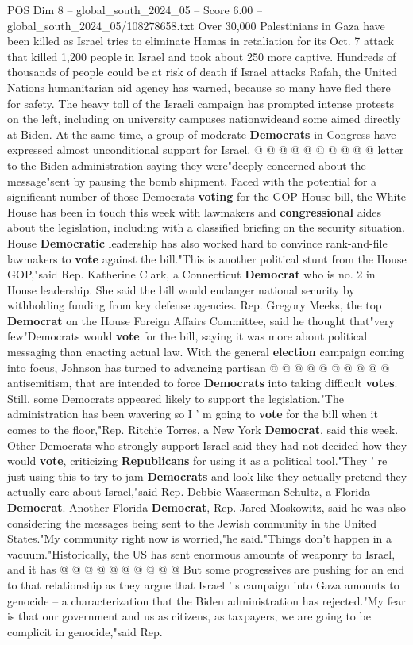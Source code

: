 \begin{textsample}{POS Dim 8 – global\_south\_2024\_05 – Score 6.00 – global\_south\_2024\_05/108278658.txt}
Over 30,000 Palestinians in Gaza have been killed as Israel tries to eliminate Hamas in retaliation for its Oct. 7 attack that killed 1,200 people in Israel and took about 250 more captive.
Hundreds of thousands of people could be at risk of death if Israel attacks Rafah, the United Nations humanitarian aid agency has warned, because so many have fled there for safety.
The heavy toll of the Israeli campaign has prompted intense protests on the left, including on university campuses nationwideand some aimed directly at Biden.
At the same time, a group of moderate \textbf{Democrats} in Congress have expressed almost unconditional support for Israel. @ @ @ @ @ @ @ @ @ @ letter to the Biden administration saying they were"deeply concerned about the message"sent by pausing the bomb shipment.
Faced with the potential for a significant number of those Democrats \textbf{voting} for the GOP House bill, the White House has been in touch this week with lawmakers and \textbf{congressional} aides about the legislation, including with a classified briefing on the security situation.
House \textbf{Democratic} leadership has also worked hard to convince rank-and-file lawmakers to \textbf{vote} against the bill."This is another political stunt from the House GOP,"said Rep.
Katherine Clark, a Connecticut \textbf{Democrat} who is no. 2 in House leadership.
She said the bill would endanger national security by withholding funding from key defense agencies.
Rep.
Gregory Meeks, the top \textbf{Democrat} on the House Foreign Affairs Committee, said he thought that"very few"Democrats would \textbf{vote} for the bill, saying it was more about political messaging than enacting actual law.
With the general \textbf{election} campaign coming into focus, Johnson has turned to advancing partisan @ @ @ @ @ @ @ @ @ @ antisemitism, that are intended to force \textbf{Democrats} into taking difficult \textbf{votes}.
Still, some Democrats appeared likely to support the legislation."The administration has been wavering so I ' m going to \textbf{vote} for the bill when it comes to the floor,"Rep.
Ritchie Torres, a New York \textbf{Democrat}, said this week.
Other Democrats who strongly support Israel said they had not decided how they would \textbf{vote}, criticizing \textbf{Republicans} for using it as a political tool."They ' re just using this to try to jam \textbf{Democrats} and look like they actually pretend they actually care about Israel,"said Rep.
Debbie Wasserman Schultz, a Florida \textbf{Democrat}.
Another Florida \textbf{Democrat}, Rep.
Jared Moskowitz, said he was also considering the messages being sent to the Jewish community in the United States."My community right now is worried,"he said."Things don't happen in a vacuum."Historically, the US has sent enormous amounts of weaponry to Israel, and it has @ @ @ @ @ @ @ @ @ @ But some progressives are pushing for an end to that relationship as they argue that Israel ' s campaign into Gaza amounts to genocide -- a characterization that the Biden administration has rejected."My fear is that our government and us as citizens, as taxpayers, we are going to be complicit in genocide,"said Rep.

\end{textsample}
